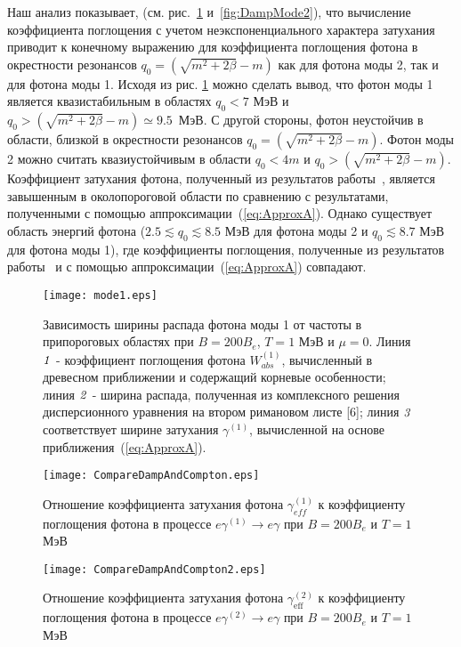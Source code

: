 \newpage
Наш анализ показывает, (см. рис.~\ref{fig:DampMode1} и~\ref{fig:DampMode2}),
что вычисление коэффициента  поглощения с учетом неэкспоненциального характера 
затухания приводит к конечному выражению для коэффициента  поглощения фотона в окрестности резонансов 
$q_0 = (\sqrt{m^2+2 \beta} - m )$ как для фотона моды 2, так и для фотона моды 1. Исходя из рис. \ref{fig:DampMode1} можно сделать вывод, что фотон моды 1 является квазистабильным в областях $q_0<7$ МэВ и $q_0>(\sqrt{m^2+2 \beta} - m)\simeq 9.5$~МэВ. С другой стороны, фотон неустойчив в области, близкой в окрестности резонансов $q_0 = (\sqrt{m^2+2 \beta} - m )$. Фотон моды 2 можно считать квазиустойчивым в области $q_0<4m$ и $q_0>(\sqrt{m^2+2 \beta} - m)$. Коэффициент затухания фотона, полученный из результатов работы~\cite{Shabad:1988}, является завышенным в околопороговой области по сравнению с результатами, полученными с помощью аппроксимации~(\ref{eq:ApproxA}). Однако существует область энергий фотона ($2.5\lesssim q_0\lesssim 8.5$ МэВ для фотона моды 2 и $q_0\lesssim8.7$ МэВ для фотона моды 1), где коэффициенты поглощения, полученные из результатов работы~\cite{Shabad:1988} и с помощью аппроксимации~(\ref{eq:ApproxA}) совпадают.


\begin{figure}[t]\centering
	\texttt{[image: mode1.eps]}
	\caption{\label{fig:fig1}Зависимость ширины распада фотона моды 1 от частоты в припороговых областях при $B=200 B_e$, $T=1$ МэВ и $ \mu=0 $. Линия $ {\it 1} $ - коэффициент поглощения фотона $ W ^ {(1)}_{abs} $,
		вычисленный в древесном приближении и содержащий корневые особенности; линия $ {\it 2} $ - ширина распада, полученная из комплексного решения дисперсионного уравнения на втором римановом листе [6]; линия $ {\it 3} $ соответствует ширине затухания $ \gamma^{(1)}$, вычисленной на основе приближения~(\ref{eq:ApproxA}).}\label{fig:DampMode1}
\end{figure}

\begin{figure}[t!]\centering
	\texttt{[image: CompareDampAndCompton.eps]}
	\caption{\label{fig:ComptonandDamp} Отношение коэффициента затухания фотона $\gamma_{eff}^{(1)}$ к коэффициенту поглощения фотона в процессе $e\gamma^{(1)}\to e\gamma$ при $B=200B_e$ и $T=1$ МэВ}
\end{figure}
\begin{figure}[t!]\centering
	\texttt{[image: CompareDampAndCompton2.eps]}
	\caption{\label{fig:ComptonandDamp2} Отношение коэффициента затухания фотона $\gamma_\text{eff}^{(2)}$ к коэффициенту поглощения фотона в процессе $e\gamma^{(2)}\to e\gamma$ при $B=200B_e$ и $T=1$ МэВ}
\end{figure}
\clearpage

